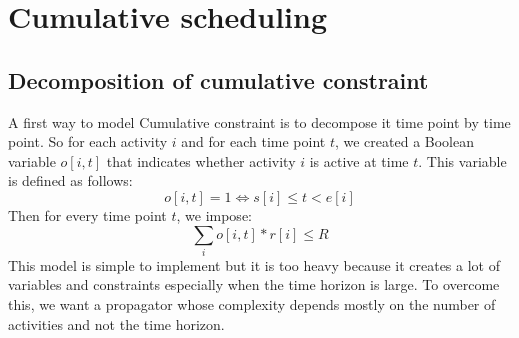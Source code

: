 \documentclass[12pt, openany]{report}
\theoremstyle{definition}
\begin{document}
\section{Cumulative scheduling}
\subsection{Decomposition of cumulative constraint}
A first way to model Cumulative constraint is to decompose it time point by time point. So for each activity $i$ and for each time point $t$, we created a Boolean variable $o[i,t]$ that indicates whether activity $i$ is active at time $t$. This variable is defined as follows:
\begin{equation}
    o[i,t] = 1 \iff s[i] \leq t < e[i]
\end{equation}
Then for every time point $t$, we impose:
\begin{equation}
    \sum_{i} o[i,t] * r[i] \leq R
\end{equation}
This model is simple to implement but it is too heavy because it creates a lot of variables and constraints especially when the time horizon is large. To overcome this, we want a propagator whose complexity depends mostly on the number of activities and not the time horizon.\\ 
\end{document}
